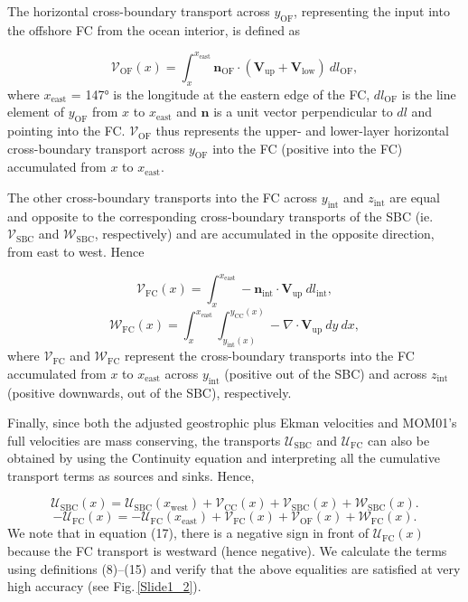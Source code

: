 \documentclass[preprint,3p,review,12pt]{elsarticle}
\renewcommand{\Vec}[1]{\mathbf{#1}}
\newcommand{\sub}[1]{_{\text{#1}}}
\begin{document}
The horizontal cross-boundary transport across $y\sub{OF}$, representing the input into the offshore FC from the ocean interior, is defined as

\begin{equation} \label{eq:8}
\mathcal{V}\sub{OF}(x) = \int_{x}^{x\sub{east}}\Vec{n}\sub{OF}\cdot(\Vec{V}\sub{up} + \Vec{V}\sub{low})\ dl\sub{OF},
\end{equation}
%
where $x\sub{east}$ = \ang{147} is the longitude at the eastern edge of the FC, $dl\sub{OF}$ is the line element of $y\sub{OF}$ from $x$ to $x\sub{east}$ and $\Vec{n}$ is a unit vector perpendicular to $dl$ and pointing into the FC\@. $\mathcal{V}\sub{OF}$ thus represents the upper- and lower-layer horizontal cross-boundary transport across $y\sub{OF}$ into the FC (positive into the FC) accumulated from $x$ to $x\sub{east}$. 

The other cross-boundary transports into the FC across $y\sub{int}$ and $z\sub{int}$ are equal and opposite to the corresponding cross-boundary transports of the SBC (ie. $\mathcal{V}\sub{SBC}$ and $\mathcal{W}\sub{SBC}$, respectively) and are accumulated in the opposite direction, from east to west. Hence

\begin{equation} \label{eq:9}
\mathcal{V}\sub{FC}(x) = \int_{x}^{x\sub{east}}-\Vec{n}\sub{int}\cdot\Vec{V}\sub{up}\ dl\sub{int},
\end{equation}
%
\begin{equation} \label{eq:10}
\mathcal{W}\sub{FC}(x) = \int_{x}^{x\sub{east}} \int_{y\sub{int}(x)}^{y\sub{CC}(x)} -\nabla\cdot\Vec{V}\sub{up}\ dy\ dx,
\end{equation}
%
where $\mathcal{V}\sub{FC}$ and $\mathcal{W}\sub{FC}$ represent the cross-boundary transports into the FC accumulated from $x$ to $x\sub{east}$ across $y\sub{int}$ (positive out of the SBC) and across $z\sub{int}$ (positive downwards, out of the SBC), respectively.

Finally, since both
the adjusted geostrophic plus Ekman velocities and MOM01's full velocities are mass conserving, the transports $\mathcal{U}\sub{SBC}$ and $\mathcal{U}\sub{FC}$ can also be obtained by using the Continuity equation and interpreting all the cumulative transport terms as sources and sinks. Hence,

\begin{equation} \label{eq:11}
\mathcal{U}\sub{SBC}(x) = \mathcal{U}\sub{SBC}(x\sub{west}) + \mathcal{V}\sub{CC}(x) + \mathcal{V}\sub{SBC}(x) + \mathcal{W}\sub{SBC}(x).
\end{equation}
%
\begin{equation} \label{eq:12}
-\mathcal{U}\sub{FC}(x) = -\mathcal{U}\sub{FC}(x\sub{east}) + \mathcal{V}\sub{FC}(x) + \mathcal{V}\sub{OF}(x) + \mathcal{W}\sub{FC}(x).
\end{equation}
%
We note that in equation (17), there is a negative sign in front of $\mathcal{U}\sub{FC}(x)$ because the FC transport is westward (hence negative). We calculate the terms using definitions (8)--(15)
and verify that the above equalities are satisfied at
very high accuracy (see Fig.\,\ref{Slide1_2}).
\end{document}
